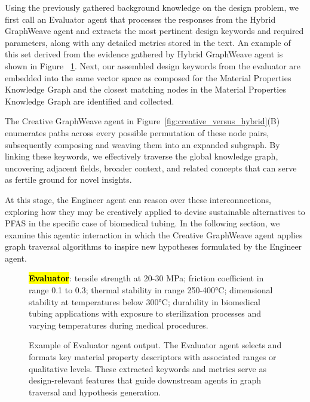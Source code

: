 Using the previously gathered background knowledge on the design problem, we first call an Evaluator agent that processes the responses from the Hybrid GraphWeave agent and extracts the most pertinent design keywords and required parameters, along with any detailed metrics stored in the text. An example of this set derived from the evidence gathered by Hybrid GraphWeave agent is shown in Figure ~\ref{fig:evaluator}. Next, our assembled design keywords from the evaluator are embedded into the same vector space as composed for the Material Properties Knowledge Graph and the closest matching nodes in the Material Properties Knowledge Graph are identified and collected. 

The Creative GraphWeave agent in Figure~\ref{fig:creative_versus_hybrid}(B) enumerates paths across every possible permutation of these node pairs, subsequently composing and weaving them into an expanded subgraph. By linking these keywords, we effectively traverse the global knowledge graph, uncovering adjacent fields, broader context, and related concepts that can serve as fertile ground for novel insights.

At this stage, the Engineer agent can reason over these interconnections, exploring how they may be creatively applied to devise sustainable alternatives to PFAS in the specific case of biomedical tubing. In the following section, we examine this agentic interaction in which the Creative GraphWeave agent applies graph traversal algorithms to inspire new hypotheses formulated by the Engineer agent. 

\begin{figure}[htbp]
  \centering
  \begin{mdframed}[
    frametitle={Evaluator Response},
    frametitlefont=\bfseries\sffamily\small,
    backgroundcolor=white,
    linecolor=black,
    linewidth=0.5pt,
    innerleftmargin=6pt,
    innerrightmargin=6pt,
    innertopmargin=6pt,
    innerbottommargin=6pt
  ]
    \ttfamily\scriptsize
    \textbf{\hl{Evaluator}}: 
    tensile strength at 20-30 MPa; friction coefficient in range 0.1 to 0.3; thermal stability in range 250-400°C; dimensional stability at temperatures below 300°C; durability in biomedical tubing applications with exposure to sterilization processes and varying temperatures during medical procedures.
  \end{mdframed}
  \caption{Example of Evaluator agent output. The Evaluator agent selects and formats key material property descriptors with associated ranges or qualitative levels. These extracted keywords and metrics serve as design-relevant features that guide downstream agents in graph traversal and hypothesis generation.}
  \label{fig:evaluator}
\end{figure}

